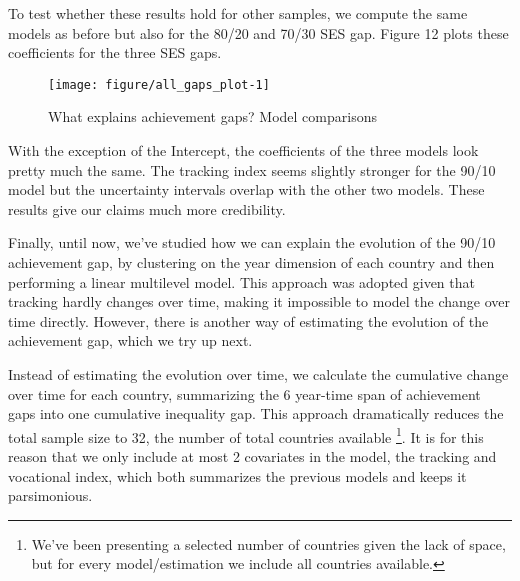 \documentclass[11pt, a4paper]{article}\usepackage[]{graphicx}\usepackage[]{color}
\begin{document}
To test whether these results hold for other samples, we compute the same models as before but also for the 80/20 and 70/30 SES gap. Figure 12 plots these coefficients for the three SES gaps.



\begin{figure}

{\centering \texttt{[image: figure/all\_gaps\_plot-1]} 

}

\caption[What explains achievement gaps? Model comparisons]{What explains achievement gaps? Model comparisons}\label{fig:all_gaps_plot}
\end{figure}



With the exception of the Intercept, the coefficients of the three models look pretty much the same. The tracking index seems slightly stronger for the 90/10 model but the uncertainty intervals overlap with the other two models. These results give our claims much more credibility.

Finally, until now, we've studied how we can explain the evolution of the 90/10 achievement gap, by clustering on the year dimension of each country and then performing a linear multilevel model. This approach was adopted given that tracking hardly changes over time, making it impossible to model the change over time directly. However, there is another way of estimating the evolution of the achievement gap, which we try up next.

Instead of estimating the evolution over time, we calculate the cumulative change over time for each country, summarizing the 6 year-time span of achievement gaps into one cumulative inequality gap. This approach dramatically reduces the total sample size to 32, the number of total countries available \footnote{We've been presenting a selected number of countries given the lack of space, but for every model/estimation we include all countries available.}. It is for this reason that we only include at most 2 covariates in the model, the tracking and vocational index, which both summarizes the previous models and keeps it parsimonious.
\end{document}
